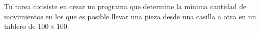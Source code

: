 \documentclass{oci}
\begin{document}
\begin{problemDescription}
  \begin{center}
  \small
  \end{center}
  
  Tu tarea consiste en crear un programa que determine la mínima cantidad de movimientos en los que es posible llevar una pieza desde una casilla a otra en un tablero de $100\times 100$.
\end{problemDescription}
\end{document}
